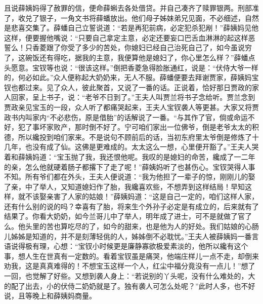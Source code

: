 \begin{parag}
    且说薛姨妈得了赦罪的信，便命薛蝌去各处借贷。并自己凑齐了赎罪银两。刑部准了，收兑了银子，一角文书将薛蟠放出。他们母子姊妹弟兄见面，不必细述，自然是悲喜交集了。薛蟠自己立誓说道：“若是再犯前病，必定犯杀犯剐！”薛姨妈见他这样，便要握他嘴说：“只要自己拿定主意，必定还要妄口巴舌血淋淋的起这样恶誓么！只香菱跟了你受了多少的苦处，你媳妇已经自己治死自己了，如今虽说穷了，这碗饭还有得吃，据我的主意，我便算他是媳妇了，你心里怎么样？”薛蟠点头愿意。宝钗等也说：“很该这样。”倒把香菱急得脸胀通红，说是：“伏侍大爷一样的，何必如此。”众人便称起大奶奶来，无人不服。薛蟠便要去拜谢贾家，薛姨妈宝钗也都过来。见了众人，彼此聚首，又说了一番的话。正说着，恰好那日贾政的家人回家，呈上书子，说：“老爷不日到了。”王夫人叫贾兰将书子念给听。贾兰念到贾政亲见宝玉的一段，众人听了都痛哭起来，王夫人宝钗袭人等更甚。大家又将贾政书内叫家内“不必悲伤，原是借胎”的话解说了一番。“与其作了官，倘或命运不好，犯了事坏家败产，那时倒不好了。宁可咱们家出一位佛爷，倒是老爷太太的积德，所以纔投到咱们家来。不是说句不顾前后的话，当初东府里太爷倒是修炼了十几年，也没有成了仙。这佛是更难成的。太太这么一想，心里便开豁了。”王夫人哭着和薛姨妈道：“宝玉抛了我，我还恨他呢。我叹的是媳妇的命苦，纔成了一二年的亲，怎么他就硬着肠子都撂下了走了呢！”薛姨妈听了也甚伤心。宝钗哭得人事不知。所有爷们都在外头，王夫人便说道：“我为他担了一辈子的惊，刚刚儿的娶了亲，中了举人，又知道媳妇作了胎，我纔喜欢些，不想弄到这样结局！早知这样，就不该娶亲害了人家的姑娘！”薛姨妈道：“这是自己一定的，咱们这样人家，还有什么别的说的吗？幸喜有了胎，将来生个外孙子必定是有成立的，后来就有了结果了。你看大奶奶，如今兰哥儿中了举人，明年成了进士，可不是就做了官了么。他头里的苦也算吃尽的了，如今的甜来，也是他为人的好处。我们姑娘的心肠儿姊姊是知道的，并不是刻薄轻佻的人，姊姊倒不必耽忧。”王夫人被薛姨妈一番言语说得极有理，心想：“宝钗小时候更是廉静寡欲极爱素淡的，他所以纔有这个事，想人生在世真有一定数的。看着宝钗虽是痛哭，他端庄样儿一点不走，却倒来劝我，这是真真难得的！不想宝玉这样一个人，红尘中福分竟没有一点儿！”想了一回，也觉解了好些。又想到袭人身上：“若说别的丫头呢，没有什么难处的，大的配了出去，小的伏侍二奶奶就是了。独有袭人可怎么处呢？”此时人多，也不好说，且等晚上和薛姨妈商量。
\end{parag}


